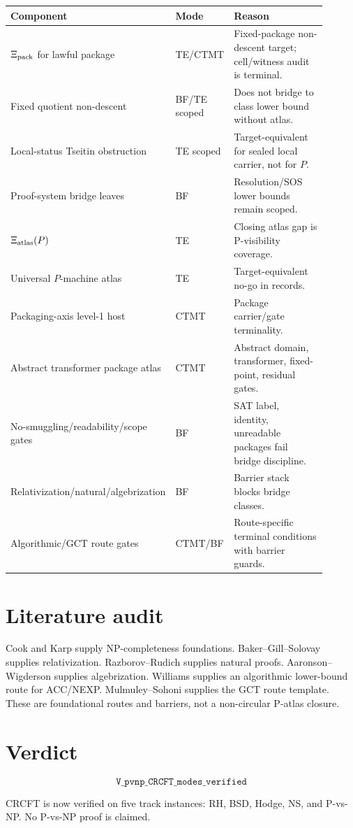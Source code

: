 \documentclass[11pt]{article}
\begin{document}
\begin{center}
\begin{tabular}{p{0.34\linewidth}p{0.16\linewidth}p{0.40\linewidth}}
\toprule
Component & Mode & Reason\\
\midrule
\(\Xi_{\rm pack}\) for lawful package & TE/CTMT & Fixed-package non-descent target; cell/witness audit is terminal.\\
Fixed quotient non-descent & BF/TE scoped & Does not bridge to class lower bound without atlas.\\
Local-status Tseitin obstruction & TE scoped & Target-equivalent for sealed local carrier, not for \(P\).\\
Proof-system bridge leaves & BF & Resolution/SOS lower bounds remain scoped.\\
\(\Xi_{\rm atlas}(P)\) & TE & Closing atlas gap is P-visibility coverage.\\
Universal \(P\)-machine atlas & TE & Target-equivalent no-go in records.\\
Packaging-axis level-1 host & CTMT & Package carrier/gate terminality.\\
Abstract transformer package atlas & CTMT & Abstract domain, transformer, fixed-point, residual gates.\\
No-smuggling/readability/scope gates & BF & SAT label, identity, unreadable packages fail bridge discipline.\\
Relativization/natural/algebrization & BF & Barrier stack blocks bridge classes.\\
Algorithmic/GCT route gates & CTMT/BF & Route-specific terminal conditions with barrier guards.\\
\bottomrule
\end{tabular}
\end{center}

\section{Literature audit}

Cook and Karp supply NP-completeness foundations. Baker--Gill--Solovay supplies relativization. Razborov--Rudich supplies natural proofs. Aaronson--Wigderson supplies algebrization. Williams supplies an algorithmic lower-bound route for ACC/NEXP. Mulmuley--Sohoni supplies the GCT route template. These are foundational routes and barriers, not a non-circular P-atlas closure.

\section{Verdict}

\[
\boxed{\texttt{V\_pvnp\_CRCFT\_modes\_verified}}
\]

CRCFT is now verified on five track instances: RH, BSD, Hodge, NS, and P-vs-NP. No P-vs-NP proof is claimed.
\end{document}
